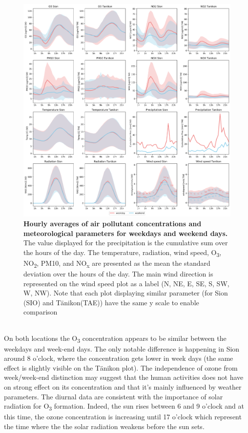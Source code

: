 \documentclass[a4paper, 12pt]{article}
\begin{document}
    \begin{figure}[!t]
        \centering
        \includegraphics[width = 1 \textwidth]{Figures/daily_avg.png}
        \caption{\textbf{Hourly averages of air pollutant concentrations and meteorological parameters for weekdays and weekend days.} The value displayed for the precipitation is the cumulative sum over the hours of the day. The temperature, radiation, wind speed, O\textsubscript{3}, NO\textsubscript{2}, PM10, and NO\textsubscript{x} are presented as the mean \textpm the standard deviation over the hours of the day. The main wind direction is represented on the wind speed plot as a label (N, NE, E, SE, S, SW, W, NW). Note that each plot displaying similar parameter (for Sion (SIO) and Tänikon(TAE)) have the same y scale to enable comparison}
        \label{daily_evolution}
    \end{figure}
    \\
    On both locations the O\textsubscript{3} concentration appears to be similar between the weekdays and week-end days. The only notable difference is happening in Sion around 8 o'clock, where the concentration gets lower in week days (the same effect is slightly visible on the Tänikon plot). The independence of ozone from week/week-end distinction may suggest that the human activities does not have on strong effect on its concentration and that it's mainly influenced by weather parameters. The diurnal data are consistent with the importance of solar radiation for O\textsubscript{3} formation. Indeed, the sun rises between 6 and 9 o'clock and at this time, the ozone concentration is increasing until 17 o'clock which represent the time where the the solar radiation weakens before the sun sets. \\
\end{document}
